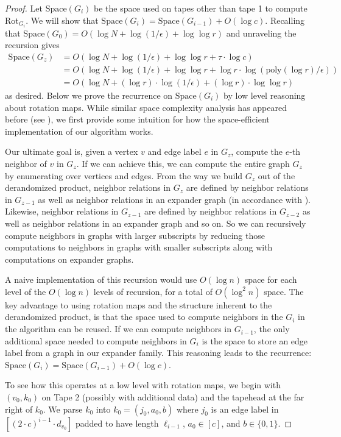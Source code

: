 \documentclass{toc}
\newcommand{\Space}{\mathrm{Space}}
\numberwithin{myalgctr}{section}
\theoremstyle{named}
\begin{document}
\begin{proof}
Let $\Space(G_i)$ be the space used on tapes other than tape 1 to compute Rot$_{G_i}$. We will show that $\Space(G_i)=\Space(G_{i-1}) + O(\log c)$. Recalling that $\Space(G_0)=O(\log N+\log(1/\epsilon)+\log\log r)$ and unraveling the recursion gives 
\begin{align*}
\Space(G_{z})&=O(\log N +\log(1/\epsilon)+\log\log r+ \tau\cdot \log c)\\
&=O(\log N + \log(1/\epsilon)+\log\log r+ \log r\cdot\log(\mathrm{poly}(\log r)/\epsilon))\\
&= O(\log N + (\log r)\cdot\log(1/\epsilon)+(\log r)\cdot \log\log r)
\end{align*}
as desired. Below we prove the recurrence on $\Space(G_i)$ by low level reasoning about rotation maps. While similar space complexity analysis has appeared before (see \cite{Reingold08, RozenmanVa05, derandbeyond2017}), we first provide some intuition for how the space-efficient implementation of our algorithm works.

Our ultimate goal is, given a vertex $v$ and edge label $e$ in $G_z$, compute the $e$-th neighbor of $v$ in $G_z$. If we can achieve this, we can compute the entire graph $G_z$ by enumerating over vertices and edges. {}From the way we build $G_z$ out of the derandomized product, neighbor relations in $G_z$ are defined by neighbor relations in $G_{z-1}$ as well as neighbor relations in an expander graph (in accordance with ). Likewise, neighbor relations in $G_{z-1}$ are defined by neighbor relations in $G_{z-2}$ as well as neighbor relations in an expander graph and so on. So we can recursively compute neighbors in graphs with larger subscripts by reducing those computations to neighbors in graphs with smaller subscripts along with computations on expander graphs.

A naive implementation of this recursion would use $O(\log n)$ space for each level of the $O(\log n)$ levels of recursion, for a total of $O(\log^2 n)$ space. The key advantage to using rotation maps and the structure inherent to the derandomized product, is that the space used to compute neighbors in
%
the $G_i$  %
in the algorithm can be reused. If we can compute neighbors in $G_{i-1}$, the only additional space needed to compute neighbors in $G_i$ is the space to store an edge label from a graph in our expander family. This reasoning leads to the recurrence: $\Space(G_i)=\Space(G_{i-1}) + O(\log c)$. 

To see how this operates at a low level with rotation maps, we begin with $(v_0, k_0)$ on Tape 2 (possibly with additional data) and the tapehead at the far right of $k_0$. We parse $k_0$ into $k_0=(j_0, a_0, b)$ where $j_0$ is an edge label in $[(2\cdot c)^{i-1}\cdot d_{v_0}]$ padded to have length $\ell_{i-1}$, $a_0\in [c]$, and $b\in\{0,1\}$. 


\end{proof}
\end{document}
